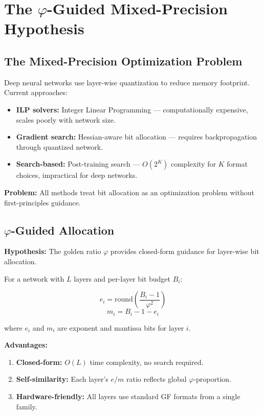 \documentclass{article}
\begin{document}
\section{The $\varphi$-Guided Mixed-Precision Hypothesis}

\subsection{The Mixed-Precision Optimization Problem}

Deep neural networks use layer-wise quantization to reduce memory footprint. Current approaches:

\begin{itemize}
    \item \textbf{ILP solvers:} Integer Linear Programming --- computationally expensive, scales poorly with network size.
    \item \textbf{Gradient search:} Hessian-aware bit allocation --- requires backpropagation through quantized network.
    \item \textbf{Search-based:} Post-training search --- $O(2^K)$ complexity for $K$ format choices, impractical for deep networks.
\end{itemize}

\textbf{Problem:} All methods treat bit allocation as an optimization problem without first-principles guidance.

\subsection{$\varphi$-Guided Allocation}

\textbf{Hypothesis:} The golden ratio $\varphi$ provides closed-form guidance for layer-wise bit allocation.

For a network with $L$ layers and per-layer bit budget $B_i$:

$$e_i = \text{round}\left(\frac{B_i - 1}{\varphi^2}\right)$$
$$m_i = B_i - 1 - e_i$$

where $e_i$ and $m_i$ are exponent and mantissa bits for layer $i$.

\textbf{Advantages:}
\begin{enumerate}
    \item \textbf{Closed-form:} $O(L)$ time complexity, no search required.
    \item \textbf{Self-similarity:} Each layer's $e/m$ ratio reflects global $\varphi$-proportion.
    \item \textbf{Hardware-friendly:} All layers use standard GF formats from a single family.
\end{enumerate}
\end{document}
